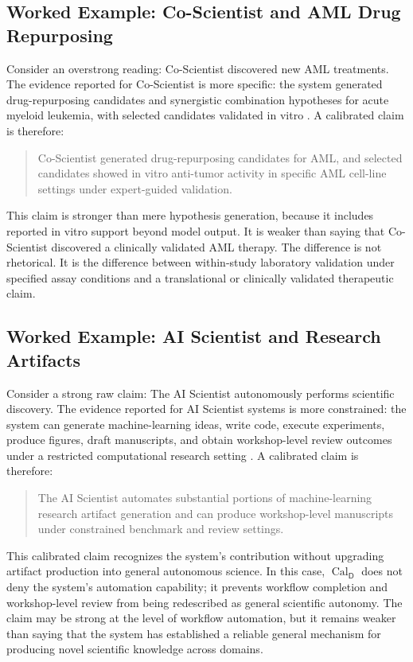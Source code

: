 \documentclass[11pt,a4paper]{article}
\newcommand{\Cal}{\operatorname{Cal}}
\newcommand{\Dom}{\mathsf{D}}
\begin{document}
\subsection{Worked Example: Co-Scientist and AML Drug Repurposing}

Consider an overstrong reading: Co-Scientist discovered new AML treatments. The evidence reported for Co-Scientist is more specific: the system generated drug-repurposing candidates and synergistic combination hypotheses for acute myeloid leukemia, with selected candidates validated in vitro \citep{Gottweis2026CoScientist}. A calibrated claim is therefore:
\begin{quote}
Co-Scientist generated drug-repurposing candidates for AML, and selected candidates showed in vitro anti-tumor activity in specific AML cell-line settings under expert-guided validation.
\end{quote}
This claim is stronger than mere hypothesis generation, because it includes reported in vitro support beyond model output. It is weaker than saying that Co-Scientist discovered a clinically validated AML therapy. The difference is not rhetorical. It is the difference between within-study laboratory validation under specified assay conditions and a translational or clinically validated therapeutic claim.

\subsection{Worked Example: AI Scientist and Research Artifacts}

Consider a strong raw claim: The AI Scientist autonomously performs scientific discovery. The evidence reported for AI Scientist systems is more constrained: the system can generate machine-learning ideas, write code, execute experiments, produce figures, draft manuscripts, and obtain workshop-level review outcomes under a restricted computational research setting \citep{Lu2026AIScientist}. A calibrated claim is therefore:
\begin{quote}
The AI Scientist automates substantial portions of machine-learning research artifact generation and can produce workshop-level manuscripts under constrained benchmark and review settings.
\end{quote}
This calibrated claim recognizes the system's contribution without upgrading artifact production into general autonomous science. In this case, $\Cal_{\Dom}$ does not deny the system's automation capability; it prevents workflow completion and workshop-level review from being redescribed as general scientific autonomy. The claim may be strong at the level of workflow automation, but it remains weaker than saying that the system has established a reliable general mechanism for producing novel scientific knowledge across domains.
\end{document}

